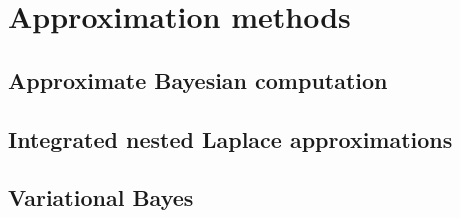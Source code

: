 \chapter{Approximation methods}\label{chap15}

\section{Approximate Bayesian computation}\label{sec15_1}

\section{Integrated nested Laplace approximations}\label{sec15_2}

\section{Variational Bayes}\label{sec15_3}




